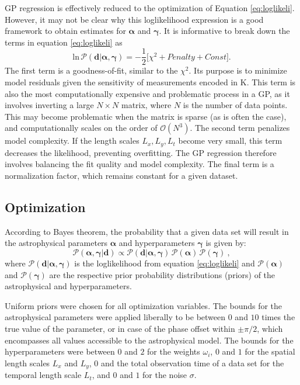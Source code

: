 \documentclass[twocolumn]{aastex61}
\begin{document}
GP regression is effectively reduced to the optimization of Equation \ref{eq:loglikeli}. However, it may not be clear why this loglikelihood expression is a good framework to obtain estimates for $\boldsymbol{\alpha}$ and $\boldsymbol{\gamma}$. It is informative to break down the terms in equation \ref{eq:loglikeli} as
\begin{equation}
  \mathrm{ln}\, \mathcal{P}(\boldsymbol{d}|\boldsymbol{\alpha},\boldsymbol{\gamma}) = -\frac{1}{2}\bigg[ \chi ^{2} +Penalty + Const \bigg].
\end{equation}
The first term is a goodness-of-fit, similar to the $\chi ^{2}$. Its purpose is to minimize model residuals given the sensitivity of measurements encoded in $\boldsymbol{\mathrm{K}}$. This term is also the most computationally expensive and problematic process in a GP, as it involves inverting a large $N \times N$ matrix, where $N$ is the number of data points. This may become problematic when the matrix is sparse (as is often the case), and computationally scales on the order of $\mathcal{O}(N^{3})$. The second term penalizes model complexity. If the length scales $L_{x},L_{y},L_{t}$ become very small, this term decreases the likelihood, preventing overfitting. The GP regression therefore involves balancing the fit quality and model complexity. The final term is a normalization factor, which remains constant for a given dataset.

\subsection{Optimization}
\label{sec:optimization}
According to Bayes theorem, the probability that a given data set will result in the astrophysical parameters $\boldsymbol{\alpha}$ and hyperparameters $\boldsymbol{\gamma}$ is given by:
\begin{equation}
  \mathcal{P}(\boldsymbol{\alpha},\boldsymbol{\gamma}|\boldsymbol{d}) \propto \mathcal{P}(\boldsymbol{d}|\boldsymbol{\alpha},\boldsymbol{\gamma})\,\mathcal{P}(\boldsymbol{\alpha})\,\mathcal{P}(\boldsymbol{\gamma})\ ,
\end{equation}
where $\mathcal{P}(\boldsymbol{d}|\boldsymbol{\alpha},\boldsymbol{\gamma})$ is the loglikelihood from equation \ref{eq:loglikeli} and $\mathcal{P}(\boldsymbol{\alpha})$ and $\mathcal{P}(\boldsymbol{\gamma})$ are the respective prior probability distributions (priors) of the astrophysical and hyperparameters.

Uniform priors were chosen for all optimization variables. The bounds for the astrophysical parameters were applied liberally to be between $0$ and $10$ times the true value of the parameter, or in case of the phase offset within $\pm \pi / 2$, which encompasses all values accessible to the astrophysical model. The bounds for the hyperparameters were between $0$ and $2$ for the weights $\omega_i$, $0$ and $1$ for the spatial length scales $L_{x}$ and $L_{y}$, $0$ and the total observation time of a data set for the temporal length scale $L_{t}$, and $0$ and $1$ for the noise $\sigma$.
\end{document}

